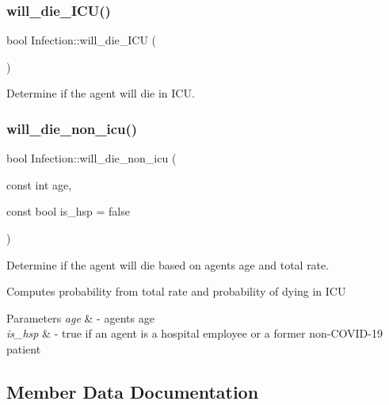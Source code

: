 \subsubsection{\texorpdfstring{will\+\_\+die\+\_\+\+I\+C\+U()}{will\_die\_ICU()}}
{\footnotesize\ttfamily bool Infection\+::will\+\_\+die\+\_\+\+I\+CU (\begin{DoxyParamCaption}{ }\end{DoxyParamCaption})}



Determine if the agent will die in I\+CU. 

\mbox{\label{classInfection_aa01e23dfc716651fccfeaa7ee254b767}} 
\subsubsection{\texorpdfstring{will\+\_\+die\+\_\+non\+\_\+icu()}{will\_die\_non\_icu()}}
{\footnotesize\ttfamily bool Infection\+::will\+\_\+die\+\_\+non\+\_\+icu (\begin{DoxyParamCaption}\item[{const int}]{age,  }\item[{const bool}]{is\+\_\+hsp = {\ttfamily false} }\end{DoxyParamCaption})}



Determine if the agent will die based on agents age and total rate. 

Computes probability from total rate and probability of dying in I\+CU 
\begin{DoxyParams}{Parameters}
{\em age} & -\/ agents age \\
\hline
{\em is\+\_\+hsp} & -\/ true if an agent is a hospital employee or a former non-\/\+C\+O\+V\+I\+D-\/19 patient \\
\hline
\end{DoxyParams}


\subsection{Member Data Documentation}
\mbox{\label{classInfection_a63da4cdd4a61a3dfd683b9bdb4bd349f}} 

